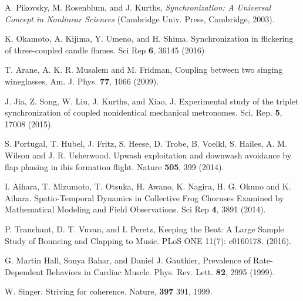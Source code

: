 \documentclass[twocolumn,showpacs,preprintnumbers,amsmath,amssymb,aps,prb]{revtex4}
\begin{document}
\begin{thebibliography}{99}
  
 A. Pikovsky, M. Rosenblum, and J. Kurths, {\it Synchronization: A Universal Concept in Nonlinear Sciences} (Cambridge Univ. Press, Cambridge, 2003).
  
 K. Okamoto, A. Kijima, Y. Umeno, and H. Shima. Synchronization in flickering of three-coupled candle flames. Sci Rep {\bf 6}, 36145 (2016)

 T. Arane, A. K. R. Musalem and M. Fridman, Coupling between two singing wineglasses, Am. J. Phys. {\bf 77}, 1066 (2009). %
  
  J. Jia, Z. Song, W. Liu, J. Kurths, and Xiao, J. Experimental study of the triplet synchronization of coupled nonidentical mechanical metronomes. Sci. Rep. {\bf 5}, 17008 (2015).

  
  
 S. Portugal, T. Hubel, J. Fritz, S. Heese, D. Trobe, B. Voelkl, S. Hailes, A. M. Wilson and J. R. Usherwood.  Upwash exploitation and downwash avoidance by flap phasing in ibis formation flight. Nature {\bf 505}, 399 (2014).

   I. Aihara, T. Mizumoto, T. Otsuka, H. Awano, K. Nagira, H. G. Okuno and K. Aihara. Spatio-Temporal Dynamics in Collective Frog Choruses Examined by Mathematical Modeling and Field Observations. Sci Rep {\bf 4}, 3891 (2014). 

   P. Tranchant, D. T. Vuvan, and I. Peretz, Keeping the Beat: A Large Sample Study of Bouncing and Clapping to Music. PLoS ONE 11(7): e0160178. (2016).

   G. Martin Hall, Sonya Bahar, and Daniel J. Gauthier, Prevalence of Rate-Dependent Behaviors in Cardiac Muscle. Phys. Rev. Lett. {\bf 82}, 2995 (1999).

   W. Singer. Striving for coherence. Nature, {\bf 397} 391, 1999.


\end{thebibliography}
\end{document}
